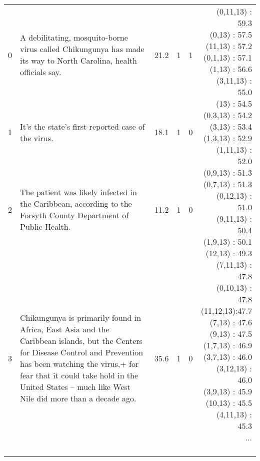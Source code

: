 \documentclass[11pt,a4paper]{article}
\begin{document}
\begin{table*}[t!]
{\begin{tabular}{| l | p{9.6cm} | c | c | c || r |}
    0 & A debilitating, mosquito-borne virus called Chikungunya has
    made its way to North Carolina, health officials say. & 21.2 & 1 &
    1 & \multirow{41}{*}{\parbox[t]{1.9cm}{ (0,11,13) : 59.3 \\ (0,13)
        : 57.5 \\ (11,13) : 57.2 \\ (0,1,13) : 57.1 \\ (1,13) : 56.6
        \\ (3,11,13) : 55.0 \\ (13) : 54.5 \\ (0,3,13) : 54.2
        \\ (3,13) : 53.4 \\ (1,3,13) : 52.9 \\ (1,11,13) : 52.0
        \\ (0,9,13) : 51.3 \\ (0,7,13) : 51.3 \\ (0,12,13) : 51.0
        \\ (9,11,13) : 50.4 \\ (1,9,13) : 50.1 \\ (12,13) : 49.3
        \\ (7,11,13) : 47.8 \\ (0,10,13) : 47.8 \\ (11,12,13):47.7
        \\ (7,13) : 47.6 \\ (9,13) : 47.5 \\ (1,7,13) : 46.9
        \\ (3,7,13) : 46.0 \\ (3,12,13) : 46.0 \\ (3,9,13) : 45.9
        \\ (10,13) : 45.5 \\ (4,11,13) : 45.3 \\ ... \\ \\ }}\\

    1 & It's the state's first reported case of the virus. & 18.1 & 1 &
    0 & \\

    2 & The patient was likely infected in the Caribbean, according to
    the Forsyth County Department of Public Health. & 11.2 & 1 & 0 & \\

    3 & Chikungunya is primarily found in Africa, East Asia and the
    Caribbean islands, but the Centers for Disease Control and
    Prevention has been watching the virus,+ for fear that it could
    take hold in the United States -- much like West Nile did more
    than a decade ago. & 35.6 & 1 & 0 & \\


\end{tabular}}
\end{table*}
\end{document}
